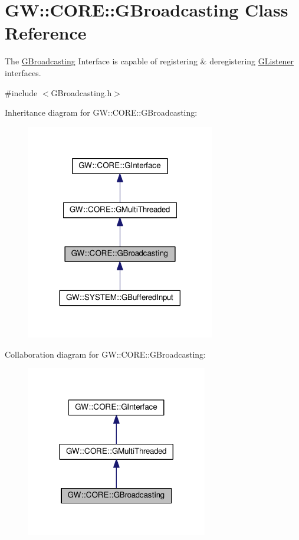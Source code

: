 \hypertarget{classGW_1_1CORE_1_1GBroadcasting}{}\section{GW\+:\+:C\+O\+RE\+:\+:G\+Broadcasting Class Reference}
\label{classGW_1_1CORE_1_1GBroadcasting}


The \hyperlink{classGW_1_1CORE_1_1GBroadcasting}{G\+Broadcasting} Interface is capable of registering \& deregistering \hyperlink{classGW_1_1CORE_1_1GListener}{G\+Listener} interfaces.  




{\ttfamily \#include $<$G\+Broadcasting.\+h$>$}



Inheritance diagram for GW\+:\+:C\+O\+RE\+:\+:G\+Broadcasting\+:
\nopagebreak
\begin{figure}[H]
\begin{center}
\leavevmode
\includegraphics[width=233pt]{classGW_1_1CORE_1_1GBroadcasting__inherit__graph}
\end{center}
\end{figure}


Collaboration diagram for GW\+:\+:C\+O\+RE\+:\+:G\+Broadcasting\+:
\nopagebreak
\begin{figure}[H]
\begin{center}
\leavevmode
\includegraphics[width=224pt]{classGW_1_1CORE_1_1GBroadcasting__coll__graph}
\end{center}
\end{figure}
